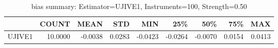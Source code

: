 \begin{table}[ht]
\centering
\caption{bias summary: Estimator=UJIVE1, Instruments=100, Strength=0.50}
\begin{tabular}{lrrrrrrrr}
\toprule
 & COUNT & MEAN & STD & MIN & 25\% & 50\% & 75\% & MAX \\
\midrule
UJIVE1 & 10.0000 & -0.0038 & 0.0283 & -0.0423 & -0.0264 & -0.0070 & 0.0154 & 0.0413 \\
\bottomrule
\end{tabular}
\end{table}
